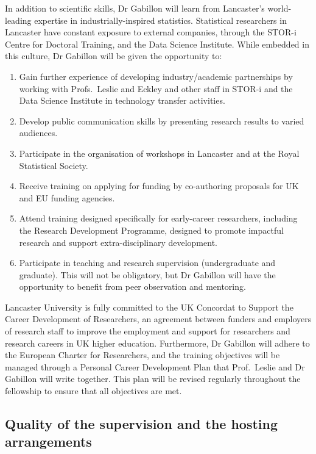 \documentclass[a4paper,11pt]{article}
\begin{document}
In addition to scientific skills, Dr Gabillon will learn from Lancaster's world-leading expertise in industrially-inspired statistics.  Statistical researchers in Lancaster have constant exposure to external companies, through the STOR-i Centre for Doctoral Training, and the Data Science Institute.  While embedded in this culture, Dr Gabillon will be given the opportunity to:
\begin{enumerate}
\item Gain further experience of developing industry/academic partnerships by working with Profs.\ Leslie and Eckley and other staff in STOR-i and the Data Science Institute in technology transfer activities.
\item Develop public communication skills by presenting research results to varied audiences.
\item Participate in the organisation of workshops in Lancaster and at the Royal Statistical Society.
\item Receive training on applying for funding by co-authoring proposals for UK and EU funding agencies.
\item Attend training designed specifically for early-career researchers, including the Research Development Programme, designed to promote impactful research and support extra-disciplinary development.
\item Participate in teaching and research supervision (undergraduate and graduate).  This will not be obligatory, but Dr Gabillon will have the opportunity to benefit from peer observation and mentoring.\end{enumerate}

Lancaster University is fully committed to the UK Concordat to Support the Career Development of Researchers, an agreement between funders and employers of research staff to improve the employment and support for researchers and research careers in UK higher education.  Furthermore, Dr Gabillon will adhere to the European Charter for Researchers, and the training objectives will be managed through a Personal Career Development Plan that Prof.\ Leslie and Dr Gabillon will write together.  This plan will be revised regularly throughout the fellowship to ensure that all objectives are met.

\subsection{Quality of the supervision and the hosting arrangements}
\label{sec:supervision}
\end{document}

